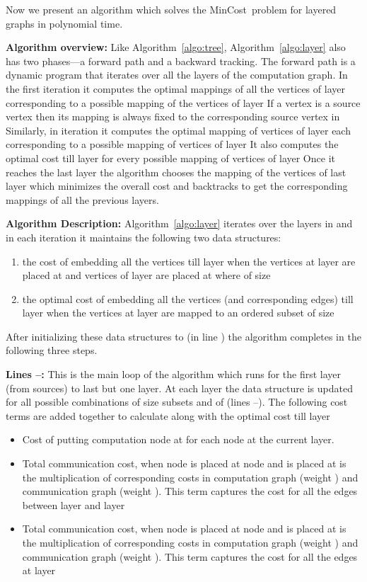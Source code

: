 \documentclass[journal]{IEEEtran}
\newcommand{\mincost}{\textsf{MinCost}}
\begin{document}
Now we present an algorithm which solves the \mincost\ problem for
layered graphs in polynomial time.

\textbf{Algorithm overview:} Like Algorithm~\ref{algo:tree},
Algorithm~\ref{algo:layer} also has two phases---a forward path and a
backward tracking. The forward path is a dynamic program that iterates
over all the layers of the computation graph. In the first iteration
it computes the optimal mappings of all the vertices of layer 
corresponding to a possible mapping of the vertices of layer  If a
vertex is a source vertex then its mapping is always fixed to the
corresponding source vertex in  Similarly, in iteration  it
computes the optimal mapping of vertices of layer  each
corresponding to a possible mapping of vertices of layer  It
also computes the optimal cost till layer  for every possible
mapping of vertices of layer  Once it reaches the last layer the
algorithm chooses the mapping of the vertices of last layer which
minimizes the overall cost and backtracks to get the corresponding
mappings of all the previous layers. 

\textbf{Algorithm Description:} Algorithm~\ref{algo:layer} iterates
over the layers in  and in each iteration it maintains the
following two data structures:
\begin{enumerate}
\item  the cost of embedding all the vertices till
  layer  when the vertices at layer  are placed at  and
  vertices of layer  are placed at  where  of size 
\item  the optimal cost of embedding all the vertices (and
  corresponding edges) till layer  when the vertices at layer
   are mapped to an ordered subset  of
  size 
\end{enumerate}

After initializing these data structures to  (in line ) the
algorithm completes in the following three steps.

\textbf{Lines --:} This is the main loop of the algorithm which
  runs for the first layer (from sources) to last but one layer. At
  each layer  the data structure  is updated for all
  possible combinations of  size subsets  and  of
   (lines --). The following cost terms are added
  together to calculate  along with the optimal cost
  till layer  
\begin{itemize}
  \item  Cost of putting computation node
     at  for each node
    at the current layer.
  \item  Total
    communication cost, when node  is
    placed at node  and  is placed at  is the
    multiplication of corresponding costs in computation graph (weight
    ) and communication graph (weight ). This term
    captures the cost for all the edges between layer  and layer
    
  \item  Total
    communication cost, when node  is
    placed at node  and  is placed at  is the
    multiplication of corresponding costs in computation graph (weight
    ) and communication graph (weight ). This term
    captures the cost for all the edges at layer 
  \end{itemize}
\end{document}
